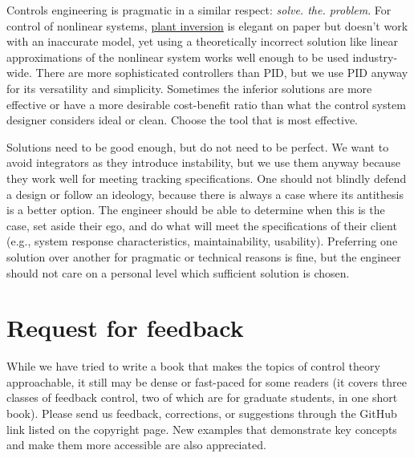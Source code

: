Controls engineering is pragmatic in a similar respect:
\textit{solve. the. problem}. For control of nonlinear systems,
\href{https://faculty.washington.edu/devasia/Inversion.html}{plant inversion}
is elegant on paper but doesn't work with an inaccurate model, yet using a
theoretically incorrect solution like linear approximations of the nonlinear
system works well enough to be used industry-wide. There are more sophisticated
controllers than PID, but we use PID anyway for its versatility and simplicity.
Sometimes the inferior solutions are more effective or have a more desirable
cost-benefit ratio than what the control system designer considers ideal or
clean. Choose the tool that is most effective.

Solutions need to be good enough, but do not need to be perfect. We want to
avoid integrators as they introduce instability, but we use them anyway because
they work well for meeting tracking specifications. One should not blindly
defend a design or follow an ideology, because there is always a case where its
antithesis is a better option. The engineer should be able to determine when
this is the case, set aside their ego, and do what will meet the specifications
of their client (e.g., system response characteristics, maintainability,
usability). Preferring one solution over another for pragmatic or technical
reasons is fine, but the engineer should not care on a personal level which
sufficient solution is chosen.

\section{Request for feedback}

While we have tried to write a book that makes the topics of control theory
approachable, it still may be dense or fast-paced for some readers (it covers
three classes of feedback control, two of which are for graduate students, in
one short book). Please send us feedback, corrections, or suggestions through
the GitHub link listed on the copyright page. New examples that demonstrate key
concepts and make them more accessible are also appreciated.
